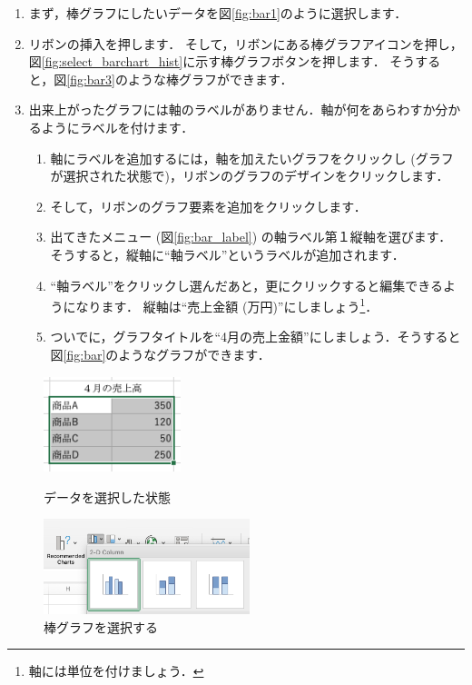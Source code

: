 \begin{enumerate}
    \item まず，棒グラフにしたいデータを図\ref{fig:bar1}のように選択します．
    \item リボンの挿入を押します．
    そして，リボンにある棒グラフアイコンを押し，図\ref{fig:select_barchart_hist}に示す棒グラフボタンを押します．
    そうすると，図\ref{fig:bar3}のような棒グラフができます．
    \item 出来上がったグラフには軸のラベルがありません．軸が何をあらわすか分かるようにラベルを付けます．
    \begin{enumerate}
        \item 軸にラベルを追加するには，軸を加えたいグラフをクリックし (グラフが選択された状態で)，リボンのグラフのデザインをクリックします．
        \item そして，リボンのグラフ要素を追加をクリックします．
        \item 出てきたメニュー (図\ref{fig:bar_label}) の軸ラベル第１縦軸を選びます．
        そうすると，縦軸に``軸ラベル''というラベルが追加されます．
        \item ``軸ラベル''をクリックし選んだあと，更にクリックすると編集できるようになります．
        縦軸は``売上金額 (万円)''にしましょう\footnote{軸には単位を付けましょう．}．
        \item ついでに，グラフタイトルを``4月の売上金額''にしましょう．そうすると図\ref{fig:bar}のようなグラフができます．
    \end{enumerate}
\end{enumerate}

\begin{figure}[tb]
    \begin{minipage}{0.5\hsize}
        \centering
        \includegraphics[width=4cm]{chap2/bar1.png}
        \caption{データを選択した状態}
        \label{fig:bar1}
    \end{minipage}
    \begin{minipage}{0.5\hsize}
        \centering
        \includegraphics[width=6cm]{chap2/bar2.png}
        \caption{棒グラフを選択する}
        \label{fig:bar2}
    \end{minipage}
\end{figure}

